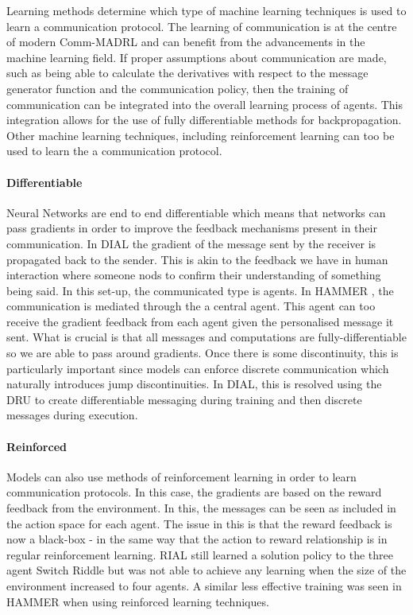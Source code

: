 \documentclass{article}
\begin{document}
Learning methods determine which type of machine learning techniques is used to learn a communication protocol. The learning of communication is at the centre of modern Comm-MADRL and can benefit from the advancements in the machine learning field. If proper assumptions about communication are made, such as being able to calculate the derivatives with respect to the message generator function and the communication policy, then the training of communication can be integrated into the overall learning process of agents. This integration allows for the use of fully differentiable methods for backpropagation. Other machine learning techniques, including reinforcement learning can too be used to learn the a communication protocol. 

\paragraph{Differentiable} Neural Networks are end to end differentiable which means that networks can pass gradients in order to improve the feedback mechanisms present in their communication. In DIAL \citep{foerster2016learning} the gradient of the message sent by the receiver is propagated back to the sender. This is akin to the feedback we have in human interaction where someone nods to confirm their understanding of something being said. In this set-up, the communicated type is agents. In HAMMER \citep{gupta2022HAMMER}, the communication is mediated through the a central agent. This agent can too receive the gradient feedback from each agent given the personalised message it sent. What is crucial is that all messages and computations are fully-differentiable so we are able to pass around gradients. Once there is some discontinuity, this is particularly important since models can enforce discrete communication which naturally introduces jump discontinuities. In DIAL, this is resolved using the DRU to create differentiable messaging during training and then discrete messages during execution.

\paragraph{Reinforced} Models can also use methods of reinforcement learning in order to learn communication protocols. In this case, the gradients are based on the reward feedback from the environment. In this, the messages can be seen as included in the action space for each agent. The issue in this is that the reward feedback is now a black-box - in the same way that the action to reward relationship is in regular reinforcement learning. RIAL \citep{foerster2016learning} still learned a solution policy to the three agent Switch Riddle but was not able to achieve any learning when the size of the environment increased to four agents. A similar less effective training was seen in HAMMER \citep{gupta2022HAMMER} when using reinforced learning techniques.
\end{document}
